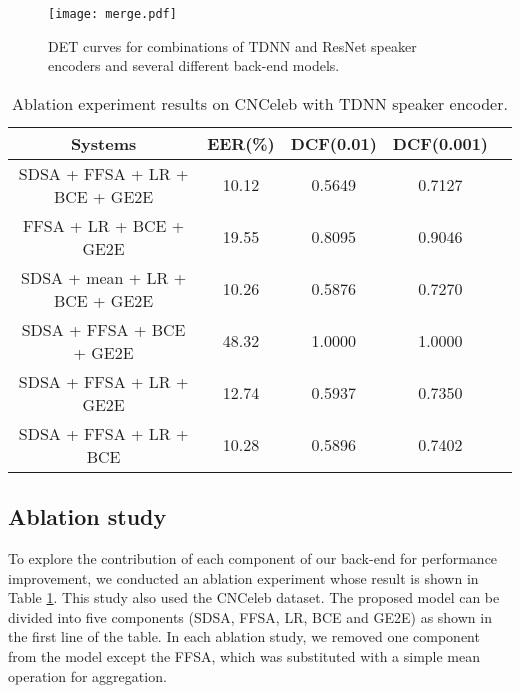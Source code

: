 \documentclass{article}
\begin{document}
\begin{figure}
\vspace{-2mm}
    \centering
    \caption{DET curves for combinations of TDNN and ResNet speaker encoders and several different back-end models.}
    \label{fig:det_tdnn}
    \vspace{2mm}
    \texttt{[image: merge.pdf]}
    \vspace{-9mm}
\end{figure}

\setlength{\tabcolsep}{0.5mm}
\begin{table}[t]
\footnotesize
  \caption{Ablation experiment results on CNCeleb with TDNN speaker encoder. }
  \label{tab:ablation}
  \centering
  \vspace{1mm}
  \begin{tabular}{c c c c c}
    \toprule
    \multicolumn{1}{c}{\textbf{Systems}} & \multicolumn{1}{c}{\textbf{EER(\%)}} & \multicolumn{1}{c}{\textbf{DCF(0.01)}} & \multicolumn{1}{c}{\textbf{DCF(0.001)}}\\
    \midrule
    SDSA + FFSA           + LR + BCE + GE2E       & 10.12          & 0.5649          & 0.7127          \\
    \phantom{SDSA +} FFSA + LR + BCE + GE2E       & 19.55          & 0.8095          & 0.9046          \\
    SDSA + mean           + LR + BCE + GE2E       & 10.26          & 0.5876          & 0.7270          \\
    SDSA + FFSA \phantom{+ LR} + BCE + GE2E       & 48.32          & 1.0000          & 1.0000          \\
    SDSA + FFSA + LR \phantom{+ BCE} + GE2E       & 12.74          & 0.5937          & 0.7350          \\
    SDSA + FFSA + LR + BCE \phantom{+ GE2E}       & 10.28          & 0.5896          & 0.7402          \\
\bottomrule
  \end{tabular}
   \vspace{-5mm}
\end{table}


\subsection{Ablation study}
\vspace{-1mm}

To explore the contribution of each component of our back-end for performance improvement, we conducted an ablation experiment whose result is shown in Table \ref{tab:ablation}. This study also used the CNCeleb dataset. The proposed model can be divided into five components (SDSA, FFSA, LR, BCE and GE2E) as shown in the first line of the table. In each ablation study, we removed one component from the model except the FFSA, which was substituted with a simple mean operation for aggregation. 
\end{document}
